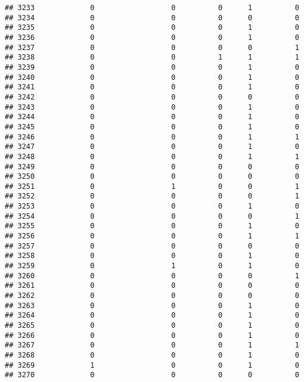 \documentclass[
]{article}
\begin{document}
\begin{verbatim}
## 3233             0                  0          0      1          0
## 3234             0                  0          0      0          0
## 3235             0                  0          0      1          0
## 3236             0                  0          0      1          0
## 3237             0                  0          0      0          1
## 3238             0                  0          1      1          1
## 3239             0                  0          0      1          0
## 3240             0                  0          0      1          0
## 3241             0                  0          0      1          0
## 3242             0                  0          0      0          0
## 3243             0                  0          0      1          0
## 3244             0                  0          0      1          0
## 3245             0                  0          0      1          0
## 3246             0                  0          0      1          1
## 3247             0                  0          0      1          0
## 3248             0                  0          0      1          1
## 3249             0                  0          0      0          0
## 3250             0                  0          0      0          0
## 3251             0                  1          0      0          1
## 3252             0                  0          0      0          1
## 3253             0                  0          0      1          0
## 3254             0                  0          0      0          1
## 3255             0                  0          0      1          0
## 3256             0                  0          0      1          1
## 3257             0                  0          0      0          0
## 3258             0                  0          0      1          0
## 3259             0                  1          0      1          0
## 3260             0                  0          0      0          1
## 3261             0                  0          0      0          0
## 3262             0                  0          0      0          0
## 3263             0                  0          0      1          0
## 3264             0                  0          0      1          0
## 3265             0                  0          0      1          0
## 3266             0                  0          0      1          0
## 3267             0                  0          0      1          1
## 3268             0                  0          0      1          0
## 3269             1                  0          0      1          0
## 3270             0                  0          0      0          0

\end{verbatim}
\end{document}
